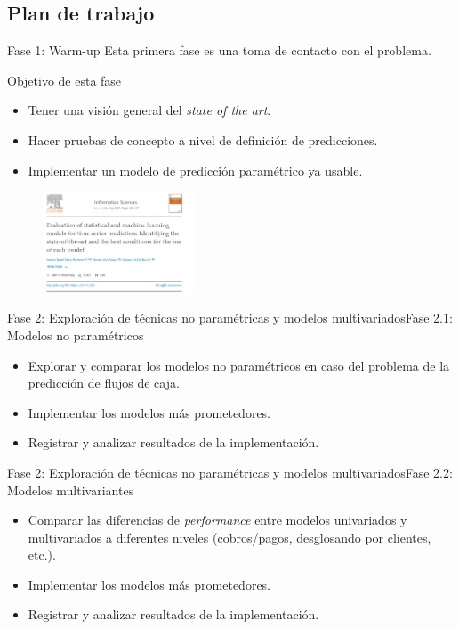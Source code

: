 \documentclass[12pt, aspectratio=169]{beamer} %
\begin{document}
\subsection{Plan de trabajo}

\begin{frame}{Fase 1: Warm-up}
  Esta primera fase es una toma de contacto con el problema.

  \begin{block}{Objetivo de esta fase}
    \begin{itemize}
    \item Tener una visión general del \textit{state of the art}.
    \item Hacer pruebas de concepto a nivel de definición de predicciones.
    \item Implementar un modelo de predicción paramétrico ya usable.
    \end{itemize}
  \end{block}

  \begin{figure}
    \includegraphics[width=0.4\textwidth]{20210413_1_evaluation_shapshot.png}
    \label{fig:evalutaion}
  \end{figure}

\end{frame}

\begin{frame}{Fase 2: Exploración de técnicas no paramétricas y modelos multivariados}{Fase 2.1: Modelos no paramétricos}
  \begin{itemize}
  \item Explorar y comparar los modelos no paramétricos en caso del problema de la predicción de flujos de caja.
  \item Implementar los modelos más prometedores.
  \item Registrar y analizar resultados de la implementación. 
  \end{itemize}
\end{frame}

\begin{frame}{Fase 2: Exploración de técnicas no paramétricas y modelos multivariados}{Fase 2.2: Modelos multivariantes}

    \begin{itemize}
    \item Comparar las diferencias de \textit{performance} entre modelos univariados y multivariados a diferentes niveles (cobros/pagos, desglosando por clientes, etc.).
    \item Implementar los modelos más prometedores.
    \item Registrar y analizar resultados de la implementación. 
    \end{itemize}


\end{frame}
\end{document}
